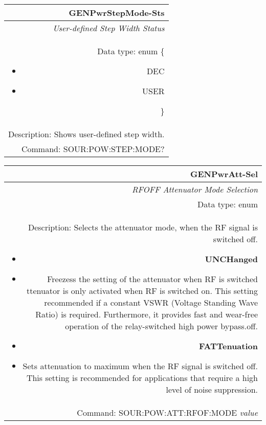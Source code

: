 \documentclass[openany]{article}
\begin{document}
		\begin{tabular}{N}
			\hline
			\bfseries GENPwrStepMode-Sts \\ \hline
			\emph{User-defined Step Width Status} \\
			Data type: enum \{\begin{itemize}[noitemsep]
				\small
				\item[] DEC
				\item[] USER
			\end{itemize}\} \\
			Description: Shows user-defined step width. \\
			Command: SOUR:POW:STEP:MODE? \\

		\end{tabular}
%
		\begin{tabular}{N}
			\hline
			\bfseries GENPwrAtt-Sel  \\ \hline
			\emph{RFOFF Attenuator Mode Selection} \\
			Data type: enum \\
			Description: Selects the attenuator mode, when the RF signal is switched off. \begin{itemize}[noitemsep]
				\small
				\item[] \textbf{UNCHanged}
				\item[] Freezess the setting of the attenuator when RF is switched ttenuator is only activated when RF is switched on. This setting recommended if a constant VSWR (Voltage Standing Wave Ratio) is required. Furthermore, it provides fast and wear-free operation of the relay-switched high power bypass.off.
				\item[] \textbf{FATTenuation}
				\item[] Sets attenuation to maximum when the RF signal is switched off. This setting is recommended for applications that require a high level of noise suppression.
			\end{itemize} \\
			Command: SOUR:POW:ATT:RFOF:MODE \emph{value} \\

		\end{tabular}
\end{document}
